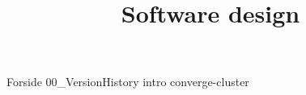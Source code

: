 \documentclass[a4paper,openany]{memoir}
\title{Software design}
\begin{document}
	{Forside}  \newpage
	\tableofcontents\thispagestyle{fancy}
	{00_VersionHistory}  \newpage
	{intro}  \newpage
	{converge-cluster}  \newpage
	
	
	
	 {}
	\printbibliography
\end{document}
